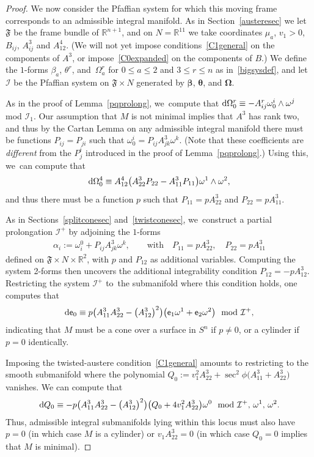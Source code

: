 \documentclass[pdftex]{sigma}
\def\R{\mathbb{R}}
\def\ve{\mathsf{e}}
\def\vOmega{\boldsymbol{\Omega}}
\def\vbeta{\boldsymbol{\beta}}
\def\vtheta{\boldsymbol{\theta}}
\def\vOmega{\boldsymbol{\Omega}}
\def\F{\mathfrak{F}}
\def\I{\mathcal{I}}
\def\w{\omega}
\numberwithin{equation}{section}
\begin{document}
\begin{proof}
We now consider the Pfaffian system for which this moving frame corresponds to an admissible integral manifold. As in Section~\ref{austeresec} we let $\F$ be the frame bundle of $\R^{n+1}$, and on $N=\R^{11}$ we take coordinates $\mu_a$, $v_1>0$, $B_{ij}$, $A^3_{ij}$ and $A^4_{12}$. (We will not yet impose conditions~\eqref{C1general} on the components of $A^3$, or impose~\eqref{C0expanded} on the components of $B$.) We define the $1$-forms $\beta_a$, $\theta^r$, and~$\Omega^r_a$ for $0\le a \le 2$ and $3 \le r \le n$ as in~\eqref{bigsysdef}, and let~$\I$ be the Pfaffian system on $\F \times N$ generated by $\vbeta$, $\vtheta$, and $\vOmega$.

As in the proof of Lemma~\ref{pqprolong}, we~compute that ${\rm d} \Omega^r_0 \equiv -A^r_{ij} \w^i_0 \wedge \w^j$ mod $\I_1$. Our assumption that $M$ is not minimal implies that $A^3$ has rank two, and thus by the Cartan Lemma on any admissible integral manifold there must be functions $P_{ij} =P_{ji}$ such that $\w^i_0 = P_{ij} A^3_{jk} \w^k$. (Note that these coefficients are \emph{different} from the $P^i_j$ introduced in the proof of Lemma~\ref{pqprolong}.) Using this, we~can compute that
\begin{gather*}
{\rm d} \Omega^4_0 \equiv A^4_{12} \big(A^3_{22} P_{22} - A^3_{11} P_{11}\big)\w^1 \wedge \w^2,
\end{gather*}
and thus there must be a function $p$ such that $P_{11}=p A^3_{22}$ and $P_{22} = p A^3_{11}$.

As in Sections~\ref{splitconesec} and~\ref{twistconesec}, we~construct a partial prolongation $\I^+$ by adjoining the $1$-forms
\begin{gather*}
\alpha_i := \w^0_i + P_{ij} A^3_{jk} \w^k, \qquad\text{with} \quad P_{11}=p A^3_{22},\quad P_{22} = p A^3_{11}
\end{gather*}
defined on $\F\times N \times \R^2$, with $p$ and $P_{12}$ as additional variables. Computing the system 2-forms then uncovers the additional integrability condition $P_{12}=-p A^3_{12}$. Restricting the system $\I^+$ to~the submanifold where this condition holds, one computes that
\begin{gather*}
{\rm d}\ve_0 \equiv p \big(A^3_{11} A^3_{22} - \big(A^3_{12}\big)^2\big) \big(\ve_1 \w^1 + \ve_2 \w^2\big)\mod \I^+,
\end{gather*}
indicating that $M$ must be a cone over a surface in $S^n$ if $p\ne0$, or a cylinder if $p=0$ identically.

Imposing the twisted-austere condition~\eqref{C1general} amounts to restricting to the smooth submanifold where the polynomial $Q_0:= v_1^2 A^3_{22} + \sec^2\phi\big(A^3_{11} + A^3_{22}\big)$ vanishes. We can compute that
\begin{gather*}
{\rm d}Q_0 \equiv -p \big(A^3_{11} A^3_{22} - \big(A^3_{12}\big)^2\big) \big(Q_0 + 4 v_1^2 A^3_{22}\big)\w^0 \mod \I^+,\, \w^1, \, \w^2.
\end{gather*}
Thus, admissible integral submanifolds lying within this locus must also have $p=0$ (in which case $M$ is a cylinder) or $v_1 A^3_{22}=0$ (in which case $Q_0=0$ implies that $M$ is minimal).


\end{proof}
\end{document}
